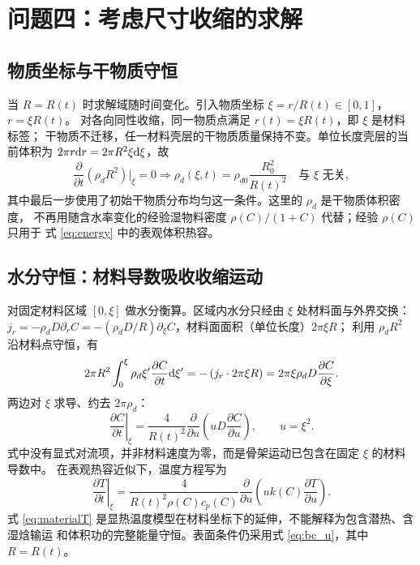 \documentclass[bwprint]{cumcmthesis}
\begin{document}
\section{问题四：考虑尺寸收缩的求解}
\label{sec:shrink}

\subsection{物质坐标与干物质守恒}

当 $R=R(t)$ 时求解域随时间变化。引入物质坐标 $\xi=r/R(t)\in[0,1]$，$r=\xi R(t)$。
对各向同性收缩，同一物质点满足 $r(t)=\xi R(t)$，即 $\xi$ 是材料标签；
干物质不迁移，任一材料壳层的干物质质量保持不变。单位长度壳层的当前体积为
$2\pi r{\rm d}r=2\pi R^2\xi{\rm d}\xi$，故
\[
\frac{\partial}{\partial t}\left(\rho_dR^2\right)\Big|_\xi=0
\Longrightarrow
\rho_d(\xi,t)=\rho_{d0}\frac{R_0^2}{R(t)^2}\quad\text{与 }\xi\text{ 无关},
\]
其中最后一步使用了初始干物质分布均匀这一条件。这里的 $\rho_d$ 是干物质体积密度，
不再用随含水率变化的经验湿物料密度 $\rho(C)/(1+C)$ 代替；经验 $\rho(C)$ 只用于
式 \eqref{eq:energy} 中的表观体积热容。

\subsection{水分守恒：材料导数吸收收缩运动}

对固定材料区域 $[0,\xi]$ 做水分衡算。区域内水分只经由 $\xi$ 处材料面与外界交换：
$j_r=-\rho_dD\partial_rC=-(\rho_dD/R)\partial_\xi C$，材料面面积（单位长度）$2\pi\xi R$；
利用 $\rho_dR^2$ 沿材料点守恒，有
\[
2\pi R^2\int_0^\xi\rho_d\xi'\frac{\partial C}{\partial t}{\rm d}\xi'
=-\left(j_r\cdot2\pi\xi R\right)=2\pi\xi\rho_dD\frac{\partial C}{\partial\xi}.
\]
两边对 $\xi$ 求导、约去 $2\pi\rho_d$：
\begin{equation}
\boxed{\;\left.\frac{\partial C}{\partial t}\right|_\xi
=\frac{4}{R(t)^2}\frac{\partial}{\partial u}\left(uD\frac{\partial C}{\partial u}\right),
\qquad u=\xi^2 .\;}
\label{eq:material}
\end{equation}
式中没有显式对流项，并非材料速度为零，而是骨架运动已包含在固定 $\xi$ 的材料导数中。
在表观热容近似下，温度方程写为
\begin{equation}
\boxed{\;\left.\frac{\partial T}{\partial t}\right|_\xi
=\frac{4}{R(t)^2\rho(C)c_p(C)}
\frac{\partial}{\partial u}\left(uk(C)\frac{\partial T}{\partial u}\right).\;}
\label{eq:materialT}
\end{equation}
式 \eqref{eq:materialT} 是显热温度模型在材料坐标下的延伸，不能解释为包含潜热、含湿焓输运
和体积功的完整能量守恒。表面条件仍采用式 \eqref{eq:bc_u}，其中 $R=R(t)$。
\end{document}
